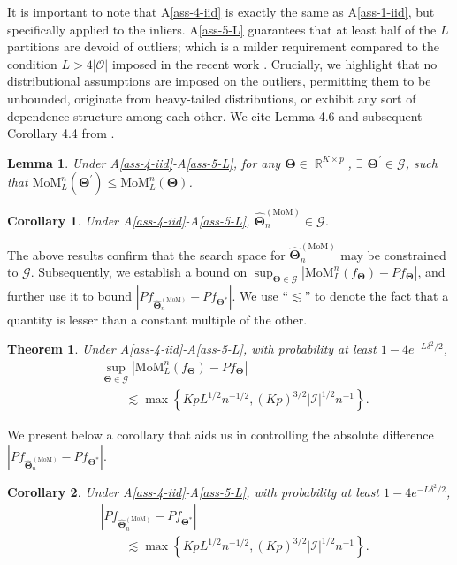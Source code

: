 \documentclass[12pt]{article}
\def\Real{\mathop{\mathbb{R}}\nolimits}
\newcommand{\bTheta}{\boldsymbol{\Theta}}
\newcommand{\I}{\mathcal{I}}
\newcommand{\cO}{\mathcal{O}}
\newcommand{\tm}{\widehat{\bTheta}_n^{(\text{MoM})}}
\newtheorem{thm}{Theorem}[section]
\newtheorem{lemma}{Lemma}[section]
\newtheorem{cor}{Corollary}[section]
\begin{document}
It is important to note that A\ref{ass-4-iid} is exactly the same as A\ref{ass-1-iid}, but specifically applied to the inliers. A\ref{ass-5-L} guarantees that at least half of the $L$ partitions are devoid of outliers; which is a milder requirement compared to the condition $L > 4|\cO|$ imposed in the recent work \cite{lecue2020robust}. Crucially, we highlight that no distributional assumptions are imposed on the outliers, permitting them to be unbounded, originate from heavy-tailed distributions, or exhibit any sort of dependence structure among each other. We cite Lemma 4.6 and subsequent Corollary 4.4 from \cite{paul2021uniform}.

\begin{lemma}\label{lemma-6-spmom}
Under A\ref{ass-4-iid}-A\ref{ass-5-L}, for any $\bTheta \in \Real^{K\times p}$, $\exists$ $\bTheta^\prime \in \mathscr{G}$, such that $\text{MoM}_L^n(\bTheta^\prime) \le \text{MoM}_L^n(\bTheta)$.
\end{lemma}

\begin{cor}
Under A\ref{ass-4-iid}-A\ref{ass-5-L}, $\tm \in \mathscr{G}$.
\end{cor}

The above results confirm that the search space for $\tm$ may be constrained to $\mathscr{G}$. Subsequently, we establish a bound on $\sup_{\bTheta \in \mathscr{G}} |\text{MoM}^n_L (f_{\bTheta}) - Pf_{\bTheta} |$, and further use it to bound $|P f_{\tm} - P f_{\bTheta^\ast}|$. 
We %
use ``$\lesssim$'' to denote the fact that a quantity is lesser than a constant multiple of the other. %


\begin{thm}\label{thm-4-MoM}
Under A\ref{ass-4-iid}-A\ref{ass-5-L}, with probability at least $1-4e^{-L \delta^2/2}$, 
\begin{align*}
    &\sup_{\bTheta \in \mathscr{G}} \left|\text{MoM}^n_L (f_{\bTheta}) - Pf_{\bTheta} \right|\\ 
    &\qquad\lesssim  \max\left\{ Kp L^{1/2}n^{-1/2}, (Kp)^{3/2}  |\I|^{1/2}n^{-1}\right\}.
\end{align*}
\end{thm}

We present below a corollary that aids us in controlling the absolute difference $|P f_{\tm} - P f_{\bTheta^\ast}|$.

\begin{cor}
Under A\ref{ass-4-iid}-A\ref{ass-5-L}, with  probability at least $1-4e^{-L \delta^2/2}$,
\begin{align*}
    &\left|P f_{\tm} - P f_{\bTheta^\ast}\right|\\ 
    &\qquad\lesssim \max\left\{ KpL^{1/2}n^{-1/2}, (Kp)^{3/2} |\I|^{1/2}n^{-1}\right\}.
\end{align*}
\end{cor}
\end{document}
